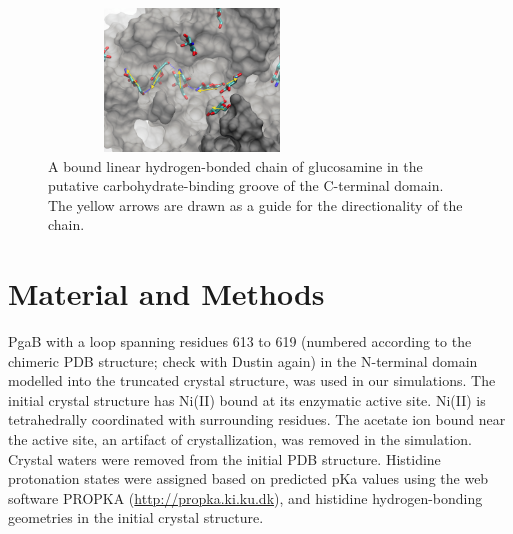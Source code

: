\begin{figure}[htbp]
\centering
\includegraphics[height=1.5in, width=3in]{figures/results4/glucosamine_binding_direction_suggestive.png}
\caption[Polymer directionality]{A bound linear hydrogen-bonded chain of glucosamine in the putative carbohydrate-binding groove of the C-terminal domain.  The yellow arrows are drawn as a guide for the directionality of the chain.}
\label{fig:directionality}
\end{figure}


\section{Material and Methods}
PgaB with a loop spanning residues 613 to 619 (numbered according to the chimeric PDB structure; check with Dustin again) in the N-terminal domain modelled into the truncated crystal structure, was used in our simulations. The initial crystal structure has Ni(II) bound at its enzymatic active site. Ni(II) is tetrahedrally coordinated with surrounding residues.  The acetate ion bound near the active site, an artifact of crystallization, was removed in the simulation. Crystal waters were removed from the initial PDB structure. Histidine protonation states were assigned based on predicted pKa values using the web software PROPKA (\url{http://propka.ki.ku.dk}), and histidine hydrogen-bonding geometries in the initial crystal structure.

